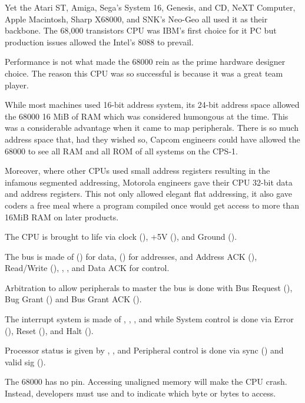 Yet the Atari ST, Amiga, Sega's System 16, Genesis, and CD, NeXT Computer, Apple Macintosh, Sharp X68000, and SNK's Neo-Geo all used it as their backbone. The 68,000 transistors CPU was IBM's first choice for it PC but production issues allowed the Intel's 8088 to prevail\cite{ieee20170630}. 

Performance is not what made the 68000 rein as the prime hardware designer choice. The reason this CPU was so successful is because it was a great team player.

While most machines used 16-bit address system, its 24-bit address space allowed the 68000 16 MiB of RAM which was considered humongous at the time. This was a considerable advantage when it came to map peripherals. There is so much address space that, had they wished so, Capcom engineers could have allowed the 68000 to see all RAM and all ROM of all systems on the CPS-1.

Moreover, where other CPUs used small address registers resulting in the infamous segmented addressing, Motorola engineers gave their CPU 32-bit data and address registers. This not only allowed elegant flat addressing, it also gave coders a free meal where a program compiled once would get access to more than 16MiB RAM on later products. 





The CPU is brought to life via clock (), +5V (), and Ground ().

The bus is made of () for data, (\icode{A1-A23]}) for addresses, and Address ACK (), Read/Write (), , , and Data ACK  for control.


Arbitration to allow peripherals to master the bus is done with Bus Request (),  Bug Grant () and Bus Grant ACK ().

The interrupt system is made of , , , and  while System control is done via Error (), Reset (), and Halt ().

Processor status is given by , ,  and Peripheral control is done via sync () and valid sig ().


\begin{trivia}
 The 68000 has no  pin. Accessing unaligned memory will make the CPU crash. Instead, developers must use  and  to indicate which byte or bytes to access.
\end{trivia}

